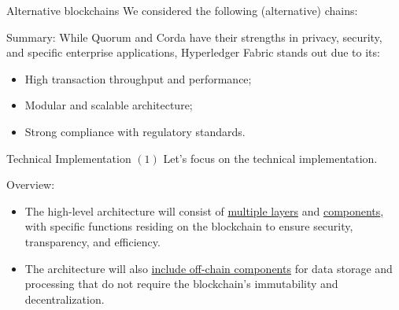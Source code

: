 \documentclass{beamer}
\begin{document}
\begin{frame}{Alternative blockchains}
We considered the following (alternative) chains:
\vspace{-0.3cm}
\begin{table}[h!]
\label{estimation3}
\end{table}
\alert{Summary}: While Quorum and Corda have their strengths in privacy, security, and specific enterprise applications, Hyperledger Fabric stands out due to its:
\begin{itemize}
\item High transaction throughput and performance;
\item Modular and scalable architecture;
\item Strong compliance with regulatory standards.
\end{itemize}
\end{frame}





\begin{frame}{Technical Implementation $(1)$}
Let's focus on the technical implementation. \newline 


\alert{Overview}: 
\begin{itemize}
\item The high-level architecture will consist of \underline{multiple layers} and \underline{components}, with specific functions residing on the blockchain to ensure security, transparency, and efficiency. 
\item The architecture will also \underline{include off-chain components} for data storage and processing that do not require the blockchain's immutability and decentralization.
\end{itemize}
\end{frame}
\end{document}
